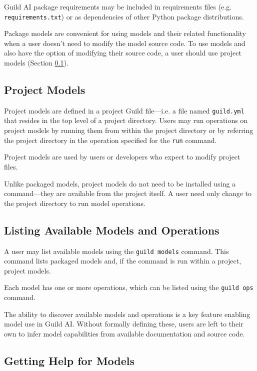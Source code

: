 \documentclass{article}
\begin{document}
Guild AI package requirements may be included in requirements files
(e.g. \verb|requirements.txt|) or as dependencies of other Python
package distributions.

Package models are convenient for using models and their related
functionality when a user doesn't need to modify the model source
code. To use models and also have the option of modifying their source
code, a user should use project models (Section
\ref{sec:project-models}).

\subsection{Project Models}
\label{sec:project-models}

Project models are defined in a project Guild file---i.e. a file named
\verb|guild.yml| that resides in the top level of a project
directory. Users may run operations on project models by running them
from within the project directory or by referring the project directory
in the operation specified for the \verb|run| command.

Project models are used by users or developers who expect to modify
project files.

Unlike packaged models, project models do not need to be installed
using a command---they are available from the project itself. A user
need only change to the project directory to run model operations.

\subsection{Listing Available Models and Operations}

A user may list available models using the \verb|guild models|
command. This command lists packaged models and, if the command is run
within a project, project models.

Each model has one or more operations, which can be listed using the
\verb|guild ops| command.

The ability to discover available models and operations is a key
feature enabling model use in Guild AI. Without formally defining
these, users are left to their own to infer model capabilities from
available documentation and source code.

\subsection{Getting Help for Models}
\end{document}
